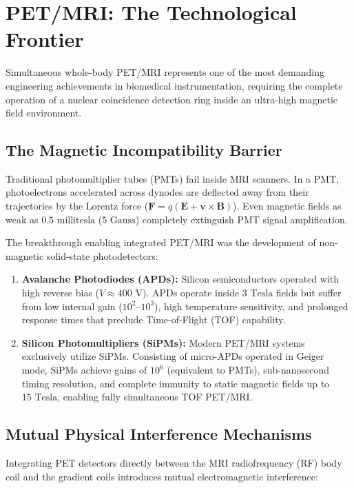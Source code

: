 \documentclass[11pt,a4paper]{article}
\begin{document}
\section{PET/MRI: The Technological Frontier}
Simultaneous whole-body PET/MRI represents one of the most demanding engineering achievements in biomedical instrumentation, requiring the complete operation of a nuclear coincidence detection ring inside an ultra-high magnetic field environment.

\subsection{The Magnetic Incompatibility Barrier}
Traditional photomultiplier tubes (PMTs) fail inside MRI scanners. In a PMT, photoelectrons accelerated across dynodes are deflected away from their trajectories by the Lorentz force ($\mathbf{F} = q(\mathbf{E} + \mathbf{v} \times \mathbf{B})$). Even magnetic fields as weak as $0.5\text{ millitesla}$ ($5\text{ Gauss}$) completely extinguish PMT signal amplification.

The breakthrough enabling integrated PET/MRI was the development of non-magnetic solid-state photodetectors:
\begin{enumerate}
    \item \textbf{Avalanche Photodiodes (APDs):} Silicon semiconductors operated with high reverse bias ($V \approx 400\text{ V}$). APDs operate inside $3\text{ Tesla}$ fields but suffer from low internal gain ($10^2\text{--}10^3$), high temperature sensitivity, and prolonged response times that preclude Time-of-Flight (TOF) capability.
    \item \textbf{Silicon Photomultipliers (SiPMs):} Modern PET/MRI systems exclusively utilize SiPMs. Consisting of micro-APDs operated in Geiger mode, SiPMs achieve gains of $10^6$ (equivalent to PMTs), sub-nanosecond timing resolution, and complete immunity to static magnetic fields up to $15\text{ Tesla}$, enabling fully simultaneous TOF PET/MRI.
\end{enumerate}

\subsection{Mutual Physical Interference Mechanisms}
Integrating PET detectors directly between the MRI radiofrequency (RF) body coil and the gradient coils introduces mutual electromagnetic interference:
\end{document}
